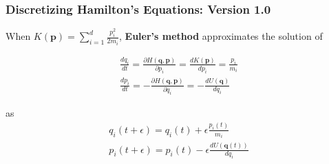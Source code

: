 \documentclass{beamer}
\begin{document}
\begin{frame}
\frametitle{Discretizing Hamilton's Equations: Version 1.0}

When $K(\mathbf{p})= \sum_{i=1}^d \frac{p_i^2}{2m_i}$, {\bf Euler's method} approximates the solution of

\begin{gather}
\frac{dq_i}{dt} = \frac{\partial H(\mathbf{q},\mathbf{p})}{\partial p_i} =  \frac{d K(\mathbf{p}) }{d p_i} = \frac{p_i}{m_i}  \\
\frac{dp_i}{dt} = -\frac{\partial H(\mathbf{q},\mathbf{p})}{\partial q_i} = -\frac{d U(\mathbf{q})}{d q_i} 
\end{gather}

as 
\begin{gather}
q_i(t + \epsilon) =  q_i(t ) + \epsilon \frac{p_i(t)}{m_i} \\
p_i(t + \epsilon) =  p_i(t) - \epsilon \frac{d U (\mathbf{q}(t))  }{d q_i} 
\end{gather}


\end{frame}
\end{document}
